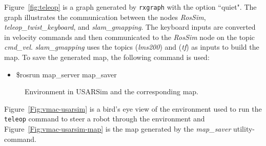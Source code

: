 Figure~\ref{fig:teleop} is a graph generated by \texttt{rxgraph} with the option ``quiet". The graph illustrates the communication between the nodes {\it RosSim}, {\it teleop\_twist\_keyboard}, and {\it slam\_gmapping}. The keyboard inputs are converted in velocity commands and then communicated to the {\it RosSim} node on the topic {\it cmd\_vel}. {\it slam\_gmapping} uses the topics ({\it lms200}) and ({\it tf}) as inputs to build the map. To save the generated map, the following command is used:

\begin{itemize}
\item[]\$rosrun map\_server map\_saver
\end{itemize}

\begin{figure}[t!]
\centering
\qquad
{}
\caption{Environment in USARSim and the corresponding map.}
\end{figure}
Figure~\ref{Fig:vmac-usarsim} is a bird's eye view of the environment used to run the \texttt{teleop} command to steer a robot through the environment and Figure~\ref{Fig:vmac-usarsim-map} is the map generated by the {\it map\_saver} utility-command.



